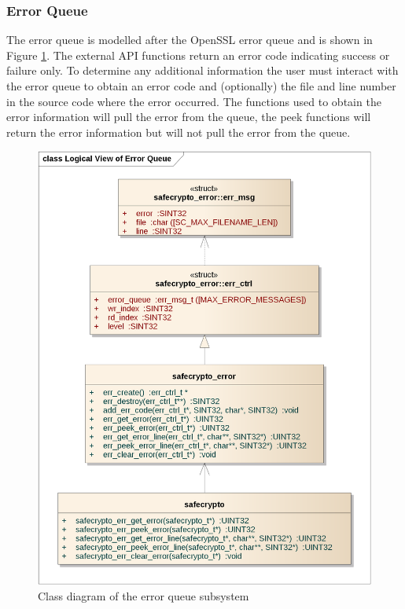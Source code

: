 \newpage
\subsubsection{Error Queue}

The error queue is modelled after the OpenSSL error queue and is shown in Figure \ref{fig:safecrypto_error_queue}. The external API functions return an error code indicating success or failure only. To determine any additional information the user must interact with the error queue to obtain an error code and (optionally) the file and line number in the source code where the error occurred. The functions used to obtain the error information will pull the error from the queue, the peek functions will return the error information but will not pull the error from the queue.

\begin{figure}[!h]
\centering
\includegraphics[width=12cm]{libsafecrypto_error_queue_logical_view.png}
\caption{Class diagram of the error queue subsystem}
\label{fig:safecrypto_error_queue}
\end{figure}


\newpage

